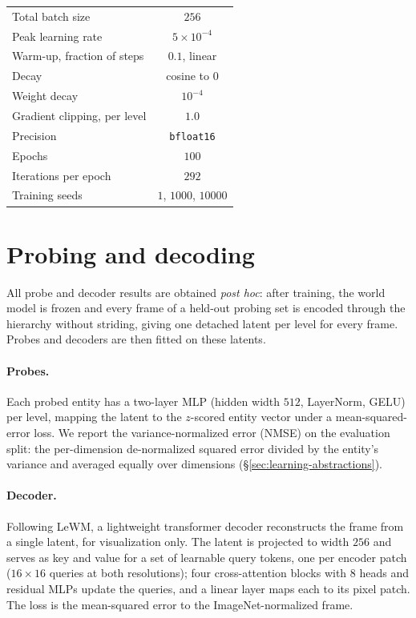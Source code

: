 \begin{table}[ht]
\begin{tabular}{lc}
Total batch size                & $256$ \\
Peak learning rate              & $5\times10^{-4}$ \\
Warm-up, fraction of steps      & $0.1$, linear \\
Decay                           & cosine to $0$ \\
Weight decay                    & $10^{-4}$ \\
Gradient clipping, per level    & $1.0$ \\
Precision                       & \texttt{bfloat16} \\
Epochs                          & $100$ \\
Iterations per epoch            & $292$ \\
Training seeds                  & $1$, $1000$, $10000$ \\
\bottomrule
\end{tabular}
\end{table}

\section{Probing and decoding}
\label{app:probing}

All probe and decoder results are obtained \emph{post hoc}: after training, the world
model is frozen and every frame of a held-out probing set is encoded through the
hierarchy without striding, giving one detached latent per level for every
frame. Probes and decoders are then fitted on these latents.

\paragraph{Probes.} Each probed entity has a two-layer MLP (hidden width $512$,
LayerNorm, GELU) per level, mapping the latent to the $z$-scored entity vector under a
mean-squared-error loss. We report the variance-normalized error (NMSE) on the
evaluation split: the per-dimension de-normalized squared error divided by
the entity's variance and averaged equally over dimensions
(\S\ref{sec:learning-abstractions}).

\paragraph{Decoder.} Following LeWM, a lightweight transformer decoder reconstructs the
frame from a single latent, for visualization only. The latent is projected to width
$256$ and serves as key and value for a set of learnable query tokens, one per
encoder patch ($16{\times}16$ queries at both resolutions); four
cross-attention blocks with $8$ heads and residual MLPs update the queries, and a linear
layer maps each to its pixel patch. The loss is the mean-squared error to the
ImageNet-normalized frame.

